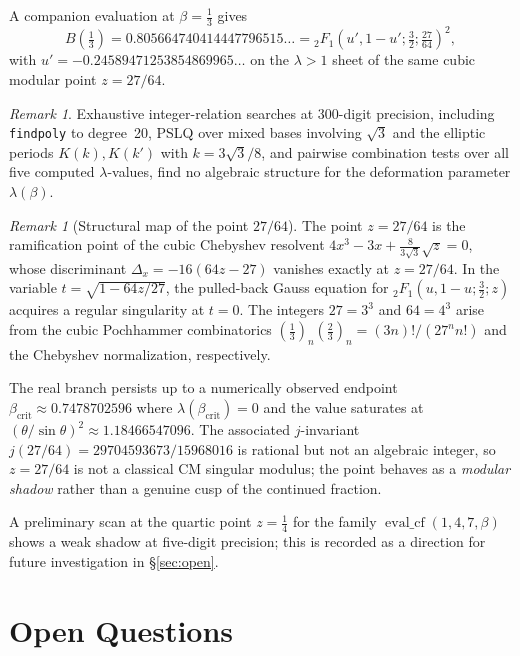 \documentclass[11pt,a4paper]{article}
\theoremstyle{plain}
\theoremstyle{definition}
\theoremstyle{remark}
\newtheorem{remark}[theorem]{Remark}
\begin{document}
A companion evaluation at $\beta=\tfrac{1}{3}$ gives
\[
  B\!\left(\tfrac{1}{3}\right)
  = 0.805664740414447796515\ldots
  = {}_2F_1\!\left(u',1-u';\tfrac{3}{2};\tfrac{27}{64}\right)^2,
\]
with $u' = -0.24589471253854869965\ldots$ on the $\lambda>1$ sheet of the same
cubic modular point $z=27/64$.

\begin{remark}
Exhaustive integer-relation searches at 300-digit precision, including \texttt{findpoly} to degree~20, PSLQ over mixed bases involving $\sqrt{3}$ and the elliptic periods $K(k),K(k')$ with $k=3\sqrt{3}/8$, and pairwise combination tests over all five computed $\lambda$-values, find no algebraic structure for the deformation parameter $\lambda(\beta)$.
\end{remark}

\begin{remark}[Structural map of the point $27/64$]
The point $z=27/64$ is the ramification point of the cubic Chebyshev resolvent
$4x^3 - 3x + \frac{8}{3\sqrt3}\sqrt{z}=0$,
whose discriminant $\Delta_x = -16(64z-27)$ vanishes exactly at $z = 27/64$.
In the variable $t = \sqrt{1 - 64z/27}$, the pulled-back Gauss equation for
${}_2F_1(u,1{-}u;\frac{3}{2};z)$ acquires a regular singularity at $t=0$.
The integers $27 = 3^3$ and $64 = 4^3$ arise from the cubic Pochhammer
combinatorics $(\frac{1}{3})_n(\frac{2}{3})_n = (3n)!/(27^n n!)$ and the
Chebyshev normalization, respectively.

The real branch persists up to a numerically observed endpoint
$\beta_{\mathrm{crit}} \approx 0.7478702596$ where
$\lambda(\beta_{\mathrm{crit}}) = 0$ and the value saturates at
$(\theta/\sin\theta)^2 \approx 1.18466547096$.
The associated $j$-invariant $j(27/64) = 29704593673/15968016$ is rational
but not an algebraic integer, so $z = 27/64$ is not a classical CM singular
modulus; the point behaves as a \emph{modular shadow} rather than a genuine
cusp of the continued fraction.
\end{remark}

A preliminary scan at the quartic point $z=\tfrac{1}{4}$ for the family
$\operatorname{eval\_cf}(1,4,7,\beta)$ shows a weak shadow at five-digit
precision; this is recorded as a direction for future investigation in
\S\ref{sec:open}.

\section{Open Questions}\label{sec:open-cubic}\label{sec:open}
\end{document}
